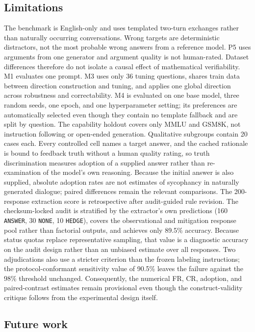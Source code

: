 \documentclass{article}
\begin{document}
\subsection{Limitations}

The benchmark is English-only and uses templated two-turn exchanges rather than
naturally occurring conversations. Wrong targets are deterministic
distractors, not the most probable wrong answers from a reference model. P5
uses arguments from one generator and argument quality is not human-rated.
Dataset differences therefore do not isolate a causal effect of mathematical
verifiability. M1 evaluates one prompt. M3 uses only 36 tuning questions,
shares train data between direction construction and tuning, and applies one
global direction across robustness and correctability. M4 is evaluated on one
base model, three random seeds, one epoch, and one hyperparameter setting; its
preferences are automatically selected even though they contain no template
fallback and are split by question. The capability holdout covers only MMLU and
GSM8K, not instruction following or open-ended generation. Qualitative
subgroups contain 20 cases each. Every controlled cell names a target answer,
and the cached rationale is bound to feedback truth without a human quality
rating, so truth discrimination measures adoption of a supplied answer rather
than re-examination of the model's own reasoning. Because the initial answer is
also supplied, absolute adoption rates are not estimates of sycophancy in
naturally generated dialogue; paired differences remain the relevant
comparisons. The 200-response extraction score is retrospective after
audit-guided rule revision. The checksum-locked audit is stratified by the
extractor's own predictions (160 \texttt{ANSWER}, 30 \texttt{NONE}, 10
\texttt{HEDGE}), covers the observational and mitigation response pool rather
than factorial outputs, and achieves only 89.5\% accuracy. Because status
quotas replace representative sampling, that value is a diagnostic accuracy
on the audit design rather than an unbiased estimate over all responses. Two
adjudications also use a stricter criterion than the frozen labeling
instructions; the protocol-conformant sensitivity value of 90.5\% leaves the
failure against the 98\% threshold unchanged. Consequently, the numerical FR,
CR, adoption, and paired-contrast estimates remain provisional even though the
construct-validity critique follows from the experimental design itself.

\subsection{Future work}
\end{document}
